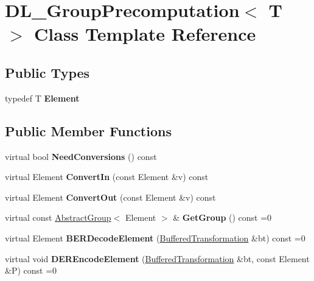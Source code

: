 \hypertarget{class_d_l___group_precomputation}{
\section{DL\_\-GroupPrecomputation$<$ T $>$ Class Template Reference}
\label{class_d_l___group_precomputation}
}
\subsection*{Public Types}
\begin{DoxyCompactItemize}
\item 
\hypertarget{class_d_l___group_precomputation_ae54cf09e58043cb37253a0ede3a1a435}{
typedef T {\bfseries Element}}
\label{class_d_l___group_precomputation_ae54cf09e58043cb37253a0ede3a1a435}

\end{DoxyCompactItemize}
\subsection*{Public Member Functions}
\begin{DoxyCompactItemize}
\item 
\hypertarget{class_d_l___group_precomputation_a1630e48b11960f96fdd2d40e090256fb}{
virtual bool {\bfseries NeedConversions} () const }
\label{class_d_l___group_precomputation_a1630e48b11960f96fdd2d40e090256fb}

\item 
\hypertarget{class_d_l___group_precomputation_a24cdc2b57dc2431297f24cf29c6af4a0}{
virtual Element {\bfseries ConvertIn} (const Element \&v) const }
\label{class_d_l___group_precomputation_a24cdc2b57dc2431297f24cf29c6af4a0}

\item 
\hypertarget{class_d_l___group_precomputation_a635d54785535b42cd9611213b6140fd0}{
virtual Element {\bfseries ConvertOut} (const Element \&v) const }
\label{class_d_l___group_precomputation_a635d54785535b42cd9611213b6140fd0}

\item 
\hypertarget{class_d_l___group_precomputation_aaa3cb55f3c6e051f8e769711784d4bcd}{
virtual const \hyperlink{class_abstract_group}{AbstractGroup}$<$ Element $>$ \& {\bfseries GetGroup} () const =0}
\label{class_d_l___group_precomputation_aaa3cb55f3c6e051f8e769711784d4bcd}

\item 
\hypertarget{class_d_l___group_precomputation_a43a840afa6f0e49a60c28883380c6990}{
virtual Element {\bfseries BERDecodeElement} (\hyperlink{class_buffered_transformation}{BufferedTransformation} \&bt) const =0}
\label{class_d_l___group_precomputation_a43a840afa6f0e49a60c28883380c6990}

\item 
\hypertarget{class_d_l___group_precomputation_a6b6549c73ef485921210e88325e9dca1}{
virtual void {\bfseries DEREncodeElement} (\hyperlink{class_buffered_transformation}{BufferedTransformation} \&bt, const Element \&P) const =0}
\label{class_d_l___group_precomputation_a6b6549c73ef485921210e88325e9dca1}

\end{DoxyCompactItemize}
